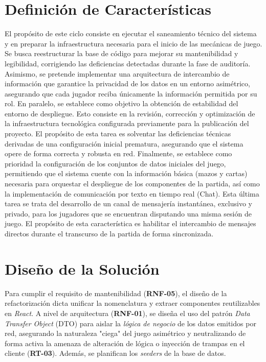 \section{Definición de Características}
El propósito de este ciclo consiste en ejecutar el saneamiento técnico del sistema y en preparar la infraestructura necesaria para el inicio de las mecánicas de juego. Se busca reestructurar la base de código para mejorar su mantenibilidad y legibilidad, corrigiendo las deficiencias detectadas durante la fase de auditoría. Asimismo, se pretende implementar una arquitectura de intercambio de información que garantice la privacidad de los datos en un entorno asimétrico, asegurando que cada jugador reciba únicamente la información permitida por su rol. En paralelo, se establece como objetivo la obtención de estabilidad del entorno de despliegue. Esto consiste en la revisión, corrección y optimización de la infraestructura tecnológica configurada previamente para la publicación del proyecto. El propósito de esta tarea es solventar las deficiencias técnicas derivadas de una configuración inicial prematura, asegurando que el sistema opere de forma correcta y robusta en red. Finalmente, se establece como prioridad la configuración de los conjuntos de datos iniciales del juego, permitiendo que el sistema cuente con la información básica (mazos y cartas) necesaria para orquestar el despliegue de los componentes de la partida, así como la implementación de comunicación por texto en tiempo real (Chat). Esta última tarea se trata del desarrollo de un canal de mensajería instantánea, exclusivo y privado, para los jugadores que se encuentran disputando una misma sesión de juego. El propósito de esta característica es habilitar el intercambio de mensajes directos durante el transcurso de la partida de forma sincronizada.

\section{Diseño de la Solución}
Para cumplir el requisito de mantenibilidad (\textbf{RNF-05}), el diseño de la refactorización dicta unificar la nomenclatura y extraer componentes reutilizables en \textit{React}. A nivel de arquitectura (\textbf{RNF-01}), se diseña el uso del patrón \textit{Data Transfer Object} (DTO) para aislar la \textit{lógica de negocio} de los datos emitidos por red, asegurando la naturaleza "ciega" del juego asimétrico y neutralizando de forma activa la amenaza de alteración de lógica o inyección de trampas en el cliente (\textbf{RT-03}). Además, se planifican los \textit{seeders} de la base de datos.

